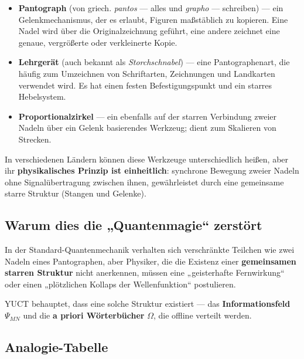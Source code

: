 \documentclass[12pt,a4paper]{article}
\begin{document}
	\begin{itemize}
		\item \textbf{Pantograph} (von griech. \textit{pantos} — alles und \textit{grapho} — schreiben) — ein Gelenkmechanismus, der es erlaubt, Figuren maßstäblich zu kopieren. Eine Nadel wird über die Originalzeichnung geführt, eine andere zeichnet eine genaue, vergrößerte oder verkleinerte Kopie.
		\item \textbf{Lehrgerät} (auch bekannt als \textit{Storchschnabel}) — eine Pantographenart, die häufig zum Umzeichnen von Schriftarten, Zeichnungen und Landkarten verwendet wird. Es hat einen festen Befestigungspunkt und ein starres Hebelsystem.
		\item \textbf{Proportionalzirkel} — ein ebenfalls auf der starren Verbindung zweier Nadeln über ein Gelenk basierendes Werkzeug; dient zum Skalieren von Strecken.
	\end{itemize}
	
	In verschiedenen Ländern können diese Werkzeuge unterschiedlich heißen, aber ihr \textbf{physikalisches Prinzip ist einheitlich}: synchrone Bewegung zweier Nadeln ohne Signalübertragung zwischen ihnen, gewährleistet durch eine gemeinsame starre Struktur (Stangen und Gelenke).
	
	\subsection{Warum dies die „Quantenmagie“ zerstört}
	
	In der Standard-Quantenmechanik verhalten sich verschränkte Teilchen wie zwei Nadeln eines Pantographen, aber Physiker, die die Existenz einer \textbf{gemeinsamen starren Struktur} nicht anerkennen, müssen eine „geisterhafte Fernwirkung“ oder einen „plötzlichen Kollaps der Wellenfunktion“ postulieren.
	
	YUCT behauptet, dass eine solche Struktur existiert — das \textbf{Informationsfeld} \(\Psi_{MN}\) und die \textbf{a priori Wörterbücher} \(\Omega\), die offline verteilt werden.
	
	\subsection{Analogie-Tabelle}
	
\end{document}
